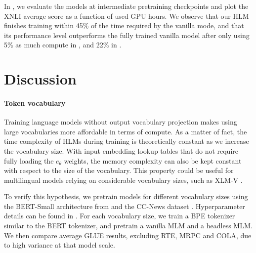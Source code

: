 In , we evaluate the models at intermediate %
pretraining checkpoints
and plot the XNLI average score as a function of used GPU hours. We observe that our HLM finishes training within 45\% of the time required by the vanilla %
mode, and that its performance level outperforms
the fully trained vanilla model after only using 5\% as much compute in , and 22\% in .




\section{Discussion}
\label{sec:discussion_hlm}
\paragraph{Token vocabulary} Training language models without output vocabulary projection makes using large vocabularies more affordable in terms of compute. As a matter of fact, the time complexity of HLMs during training is theoretically constant as we increase the vocabulary size. With input embedding lookup tables that do not require fully loading the $e_\theta$ weights, the memory complexity can also be kept constant with respect to the size of the vocabulary. This property could be useful for multilingual models relying on considerable vocabulary sizes, such as XLM-V \citep{2023arXiv230110472L}.

To verify this hypothesis, we pretrain models for different vocabulary sizes using the BERT-Small architecture from \citet{turc2019} and the CC-News dataset \citep{Hamborg2017}. Hyperparameter details can be found in . For each vocabulary size, we train a BPE tokenizer similar to the BERT tokenizer, and pretrain a vanilla MLM and a headless MLM. We then compare average GLUE results, excluding RTE, MRPC and COLA, due to high variance at that model scale.

